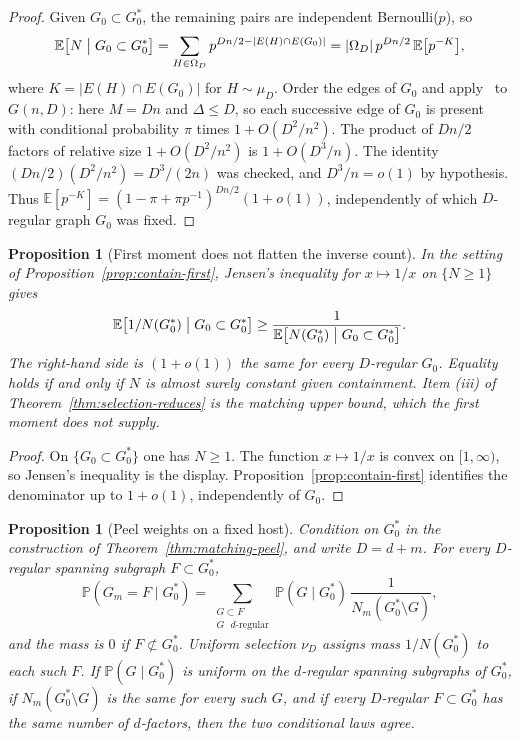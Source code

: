 \documentclass[11pt]{article}
\newtheorem{proposition}[theorem]{Proposition}
\newcommand{\EE}{\mathbb{E}}
\newcommand{\PP}{\mathbb{P}}
\begin{document}
\begin{proof}
Given \(G_0\subset G^*_0\), the remaining pairs are independent Bernoulli(\(p\)), so
\[
\EE\bigl[N\bigm|G_0\subset G^*_0\bigr]
=
\sum_{H\in\Omega_D}p^{Dn/2-\lvert E(H)\cap E(G_0)\rvert}
=
\lvert\Omega_D\rvert\,p^{Dn/2}\,\EE\bigl[p^{-K}\bigr],
\]
where \(K=\lvert E(H)\cap E(G_0)\rvert\) for \(H\sim\mu_D\).
Order the edges of \(G_0\) and apply~\cite[Theorem~6]{Gao20} to \(G(n,D)\): here \(M=Dn\) and \(\Delta\le D\), so each successive edge of \(G_0\) is present with conditional probability \(\pi\) times \(1+O(D^2/n^2)\).
The product of \(Dn/2\) factors of relative size \(1+O(D^2/n^2)\) is \(1+O(D^3/n)\).
The identity \((Dn/2)(D^2/n^2)=D^3/(2n)\) was checked, and \(D^3/n=o(1)\) by hypothesis.
Thus \(\EE[p^{-K}]=(1-\pi+\pi p^{-1})^{Dn/2}(1+o(1))\), independently of which \(D\)-regular graph \(G_0\) was fixed.
\end{proof}

\begin{proposition}[First moment does not flatten the inverse count]
\label{prop:jensen-inverse}
In the setting of Proposition~\ref{prop:contain-first}, Jensen's inequality for \(x\mapsto 1/x\) on \(\{N\ge 1\}\) gives
\[
\EE\bigl[1/N(G^*_0)\bigm|G_0\subset G^*_0\bigr]
\ge
\frac{1}{\EE\bigl[N(G^*_0)\bigm|G_0\subset G^*_0\bigr]}.
\]
The right-hand side is \((1+o(1))\) the same for every \(D\)-regular \(G_0\).
Equality holds if and only if \(N\) is almost surely constant given containment.
Item (iii) of Theorem~\ref{thm:selection-reduces} is the matching upper bound, which the first moment does not supply.
\end{proposition}

\begin{proof}
On \(\{G_0\subset G^*_0\}\) one has \(N\ge 1\).
The function \(x\mapsto 1/x\) is convex on \([1,\infty)\), so Jensen's inequality is the display.
Proposition~\ref{prop:contain-first} identifies the denominator up to \(1+o(1)\), independently of \(G_0\).
\end{proof}

\begin{proposition}[Peel weights on a fixed host]
\label{prop:peel-weights}
Condition on \(G^*_0\) in the construction of Theorem~\ref{thm:matching-peel}, and write \(D=d+m\).
For every \(D\)-regular spanning subgraph \(F\subset G^*_0\),
\[
\PP(G_m=F\mid G^*_0)
=
\sum_{\substack{G\subset F\\ G\text{ \(d\)-regular}}}
\PP(G\mid G^*_0)\,\frac{1}{N_m(G^*_0\setminus G)},
\]
and the mass is \(0\) if \(F\not\subset G^*_0\).
Uniform selection \(\nu_D\) assigns mass \(1/N(G^*_0)\) to each such \(F\).
If \(\PP(G\mid G^*_0)\) is uniform on the \(d\)-regular spanning subgraphs of \(G^*_0\), if \(N_m(G^*_0\setminus G)\) is the same for every such \(G\), and if every \(D\)-regular \(F\subset G^*_0\) has the same number of \(d\)-factors, then the two conditional laws agree.
\end{proposition}
\end{document}
